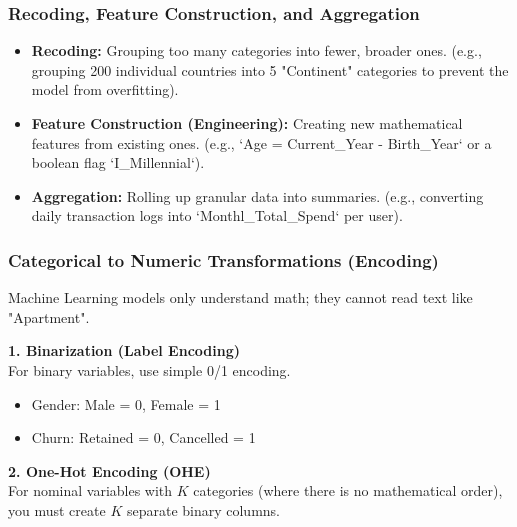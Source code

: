 \subsubsection{Recoding, Feature Construction, and Aggregation}

\begin{itemize}
    \item \textbf{Recoding:} Grouping too many categories into fewer, broader ones. (e.g., grouping 200 individual countries into 5 "Continent" categories to prevent the model from overfitting).
    \item \textbf{Feature Construction (Engineering):} Creating new mathematical features from existing ones. (e.g., `Age = Current\_Year - Birth\_Year` or a boolean flag `I\_Millennial`).
    \item \textbf{Aggregation:} Rolling up granular data into summaries. (e.g., converting daily transaction logs into `Monthl\_Total\_Spend` per user).
\end{itemize}

\subsubsection{Categorical to Numeric Transformations (Encoding)}

Machine Learning models only understand math; they cannot read text like "Apartment".

\textbf{1. Binarization (Label Encoding)} \\
For binary variables, use simple 0/1 encoding. 
\begin{itemize}
    \item Gender: Male = 0, Female = 1
    \item Churn: Retained = 0, Cancelled = 1
\end{itemize}

\textbf{2. One-Hot Encoding (OHE)} \\
For nominal variables with $K$ categories (where there is no mathematical order), you must create $K$ separate binary columns.


